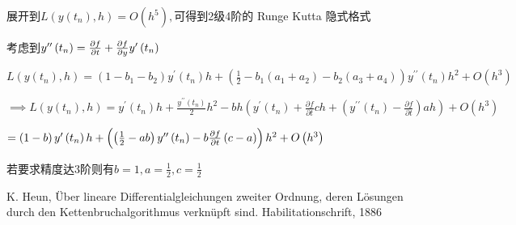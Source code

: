 \documentclass{ctexart}
\begin{document}
\bigskip 展开到$L\left( y\left( t_{n}\right) ,h\right)
=O\left( h^{5}\right) ,$可得到2级4阶的%
Runge Kutta 隐式格式


考虑到$y^{\prime \prime }\left( t_{n}\right) =\frac{%
\partial f}{\partial t}+\frac{\partial f}{\partial y}y^{\prime }\left(
t_{n}\right) $

$L\left( y\left( t_{n}\right) ,h\right) =\left( 1-b_{1}-b_{2}\right)
y^{\prime }\left( t_{n}\right) h+\left( \frac{1}{2}-b_{1}\left(
a_{1}+a_{2}\right) -b_{2}\left( a_{3}+a_{4}\right) \right) y^{\prime \prime
}\left( t_{n}\right) h^{2}+O\left( h^{3}\right) $

$\implies L\left( y\left( t_{n}\right) ,h\right) =y^{\prime }\left(
t_{n}\right) h+\frac{y^{\prime \prime }\left( t_{n}\right) }{2}%
h^{2}-bh\left( y^{\prime }\left( t_{n}\right) +\frac{\partial f}{\partial t}%
ch+\left( y^{\prime \prime }\left( t_{n}\right) -\frac{\partial f}{\partial t%
}\right) ah\right) +O\left( h^{3}\right) $

$=\left( 1-b\right) y^{\prime }\left( t_{n}\right) h+\left( \left( \frac{1}{2%
}-ab\right) y^{\prime \prime }\left( t_{n}\right) -b\frac{\partial f}{%
\partial t}\left( c-a\right) \right) h^{2}+O\left( h^{3}\right) $

若要求精度达3阶则有$%
b=1,a=\frac{1}{2},c=\frac{1}{2}$
\begin{thebibliography}{9}
 K. Heun, Über lineare Differentialgleichungen zweiter Ordnung, deren Lösungen durch den Kettenbruchalgorithmus verknüpft sind. Habilitationschrift, 1886
\end{thebibliography}
\end{document}
